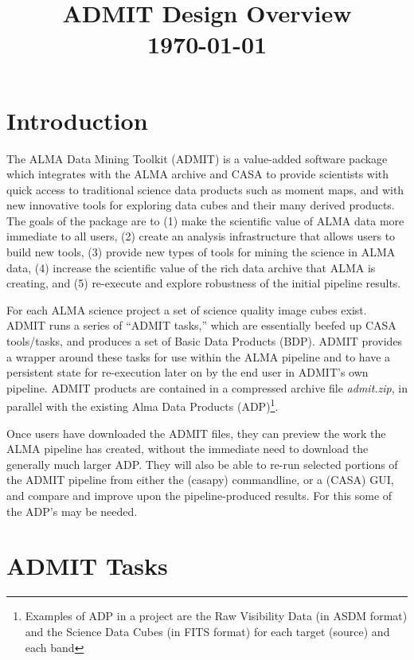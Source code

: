 \documentclass[preprint]{aastex}
\title{ADMIT Design Overview\\
\today
}
\begin{document}
\maketitle

\section{Introduction}\label{s-intro}

The ALMA Data Mining Toolkit (ADMIT) is a value-added software package
which integrates with the ALMA archive and CASA to provide scientists with
quick access to traditional science data products such as moment maps,
and with new innovative tools for exploring data cubes and their many
derived products. The goals of the
package are to (1) make the scientific value of ALMA data more immediate
to all users, (2) create an analysis infrastructure that allows users to
build new tools, (3) provide new types of tools for mining the science in
ALMA data, (4) increase the scientific value of the rich data archive
that ALMA is creating, and (5) re-execute and explore robustness of
the initial pipeline results.

For each ALMA science project a set of science quality image cubes
exist. ADMIT runs a series of ``ADMIT tasks,'' which are essentially
beefed up CASA tools/tasks, and produces a set of Basic Data Products
(BDP).  ADMIT provides a wrapper around these tasks for use within the
ALMA pipeline and to have a persistent state for re-execution later on by
the end user in ADMIT's own pipeline.  ADMIT products are contained in
a compressed archive file {\it admit.zip}, in parallel with the existing
Alma Data Products (ADP)\footnote{Examples of ADP in a project are the
Raw Visibility Data (in ASDM format) and the Science Data Cubes (in FITS
format) for each target (source) and each band}.

Once users have downloaded the ADMIT files, they can preview the work
the ALMA pipeline has created, without the immediate need to download the
generally much larger ADP. They will also be able to re-run selected portions
of the ADMIT pipeline from either the (casapy) commandline, or a
(CASA) GUI, and compare and improve upon the pipeline-produced
results. For this some of the ADP's may be needed.

\section{ADMIT Tasks} \label{s-at}
\end{document}
